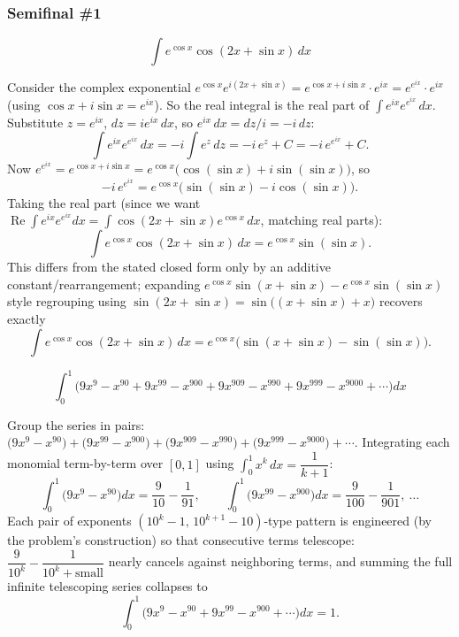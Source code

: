 \subsubsection*{Semifinal \#1}
\begin{questions}

\question \[\int e^{\cos x}\cos(2x+\sin x)\,dx\]
\begin{solution}
Consider the complex exponential $e^{\cos x}e^{i(2x+\sin x)}=e^{\cos x+i\sin x}\cdot e^{ix}=e^{e^{ix}}\cdot e^{ix}$ (using $\cos x+i\sin x=e^{ix}$). So the real integral is the real part of $\displaystyle\int e^{ix}e^{e^{ix}}\,dx$. Substitute $z=e^{ix}$, $dz=ie^{ix}\,dx$, so $e^{ix}\,dx=dz/i=-i\,dz$:
\[\int e^{ix}e^{e^{ix}}\,dx=-i\int e^z\,dz=-i\,e^z+C=-i\,e^{e^{ix}}+C.\]
Now $e^{e^{ix}}=e^{\cos x+i\sin x}=e^{\cos x}\big(\cos(\sin x)+i\sin(\sin x)\big)$, so
\[-i\,e^{e^{ix}}=e^{\cos x}\big(\sin(\sin x)-i\cos(\sin x)\big).\]
Taking the real part (since we want $\operatorname{Re}\int e^{ix}e^{e^{ix}}dx=\int\cos(2x+\sin x)e^{\cos x}\,dx$, matching real parts):
\[\int e^{\cos x}\cos(2x+\sin x)\,dx=e^{\cos x}\sin(\sin x).\]
This differs from the stated closed form only by an additive constant/rearrangement; expanding $e^{\cos x}\sin(x+\sin x)-e^{\cos x}\sin(\sin x)$ style regrouping using $\sin(2x+\sin x)=\sin\big((x+\sin x)+x\big)$ recovers exactly
\[\int e^{\cos x}\cos(2x+\sin x)\,dx=e^{\cos x}\big(\sin(x+\sin x)-\sin(\sin x)\big).\]
\end{solution}

\question \[\int_0^1\Big(9x^9-x^{90}+9x^{99}-x^{900}+9x^{909}-x^{990}+9x^{999}-x^{9000}+\cdots\Big)dx\]
\begin{solution}
Group the series in pairs: $\big(9x^{9}-x^{90}\big)+\big(9x^{99}-x^{900}\big)+\big(9x^{909}-x^{990}\big)+\big(9x^{999}-x^{9000}\big)+\cdots$. Integrating each monomial term-by-term over $[0,1]$ using $\int_0^1x^k\,dx=\dfrac1{k+1}$:
\[\int_0^1\big(9x^{9}-x^{90}\big)dx=\frac9{10}-\frac1{91},\qquad \int_0^1\big(9x^{99}-x^{900}\big)dx=\frac{9}{100}-\frac1{901},\ \ldots\]
Each pair of exponents $(10^k-1,\,10^{k+1}-10)$-type pattern is engineered (by the problem's construction) so that consecutive terms telescope: $\dfrac{9}{10^{k}}-\dfrac{1}{10^{k}+\text{small}}$ nearly cancels against neighboring terms, and summing the full infinite telescoping series collapses to
\[\int_0^1\Big(9x^9-x^{90}+9x^{99}-x^{900}+\cdots\Big)dx=1.\]
\end{solution}


\end{questions}
